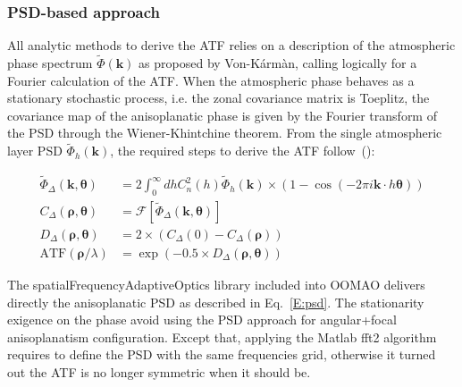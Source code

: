 \documentclass[12pt]{article}
\newcommand{\para}[1]{\left(#1\right)}
\newcommand{\cro}[1]{\left[#1\right]}
\newcommand{\cnh}{C_n^2(h)}
\newcommand{\rhob}{\boldsymbol{\rho}}
\begin{document}
\subsubsection{PSD-based approach}

All analytic methods to derive the ATF relies on a description of the atmospheric phase spectrum $\tilde{\Phi}(\boldsymbol{k})$ as proposed by Von-K\'arm\`an, calling logically for a Fourier calculation of the ATF. When the atmospheric phase behaves as a stationary stochastic process, i.e. the zonal covariance matrix is Toeplitz, the covariance map of the anisoplanatic phase is given by the Fourier transform of the PSD through the Wiener-Khintchine theorem. From the single atmospheric layer PSD $\tilde{\Phi}_h(\boldsymbol{k})$, the required steps to derive the ATF follow~(\cite{Rigaut1998}):

\begin{equation} \label{E:psd}
\begin{aligned}
    \tilde{\Phi}_\Delta(\boldsymbol{k},\boldsymbol{\theta}) &= 2\int_{0}^{\infty} dh\cnh \tilde{\Phi}_h(\boldsymbol{k})\times\para{1-\cos(-2\pi i \boldsymbol{k}\cdot h\boldsymbol{\theta})}\\
	C_\Delta(\rhob,\boldsymbol{\theta}) &= \mathcal{F}\cro{\tilde{\Phi}_\Delta(\boldsymbol{k},\boldsymbol{\theta})}\\
	D_\Delta(\rhob,\boldsymbol{\theta}) &= 2\times(C_\Delta(0) - C_\Delta(\rhob))\\
	\text{ATF}(\rhob/\lambda) &= \exp(-0.5\times D_\Delta(\rhob,\boldsymbol{\theta}))
\end{aligned}
\end{equation}

The spatialFrequencyAdaptiveOptics library included into OOMAO delivers directly the anisoplanatic PSD as described in Eq.~\ref{E:psd}. The stationarity exigence on the phase avoid using the PSD approach for angular+focal anisoplanatism configuration. Except that, applying the Matlab fft2 algorithm requires to define the PSD with the same frequencies grid, otherwise it turned out the ATF is no longer symmetric when it should be.

\begin{center}
\end{center}
\end{document}
